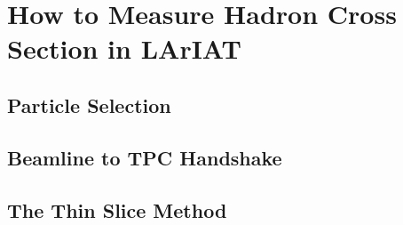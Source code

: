 \section{How to Measure Hadron Cross Section in LArIAT}\label{ch:methodology}
\subsection{Particle Selection}\label{ch:ParticleSelectionMethod}
\subsection{Beamline to TPC Handshake}\label{ch:WC2TPCMatchMethod}
\subsection{The Thin Slice Method}
